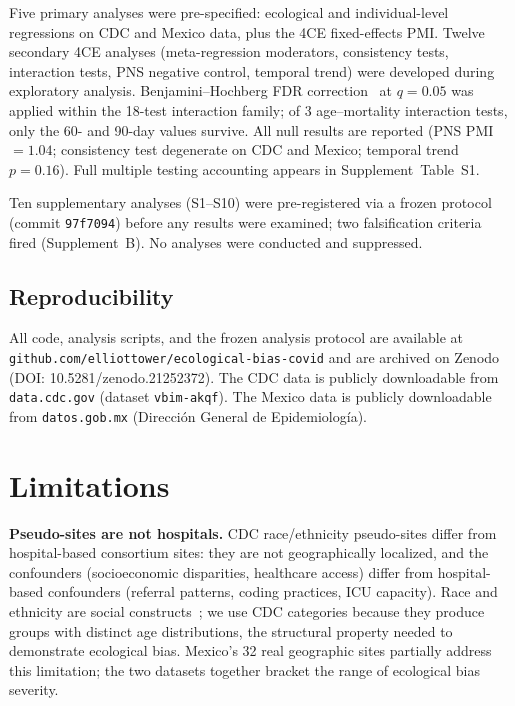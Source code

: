 \documentclass[11pt]{article}
\begin{document}
Five primary analyses were pre-specified: ecological and individual-level
regressions on CDC and Mexico data, plus the 4CE fixed-effects PMI.
Twelve secondary 4CE analyses (meta-regression moderators, consistency
tests, interaction tests, PNS negative control, temporal trend) were
developed during exploratory analysis.
Benjamini--Hochberg FDR correction~\cite{benjamini1995fdr} at $q = 0.05$
was applied within the 18-test interaction family; of 3 age--mortality
interaction tests, only the 60- and 90-day values survive.  All null
results are reported (PNS PMI $= 1.04$; consistency test degenerate on
CDC and Mexico; temporal trend $p = 0.16$).  Full multiple testing
accounting appears in Supplement~Table~S1.

Ten supplementary analyses (S1--S10) were pre-registered via a frozen
protocol (commit \texttt{97f7094}) before any results were examined;
two falsification criteria fired (Supplement~B).  No analyses were
conducted and suppressed.

\subsection{Reproducibility}

All code, analysis scripts, and the frozen analysis protocol are
available at
\texttt{github.com/elliottower/ecological-bias-covid}
and are archived on Zenodo (DOI: 10.5281/zenodo.21252372).
The CDC data is publicly downloadable from \texttt{data.cdc.gov} (dataset
\texttt{vbim-akqf}).  The Mexico data is publicly downloadable from
\texttt{datos.gob.mx} (Direcci\'{o}n General de Epidemiolog\'{i}a).


\section{Limitations}

\textbf{Pseudo-sites are not hospitals.}  CDC race/ethnicity pseudo-sites
differ from hospital-based consortium sites: they are not geographically
localized, and the confounders (socioeconomic disparities, healthcare
access) differ from hospital-based confounders (referral patterns, coding
practices, ICU capacity).  Race and ethnicity are social
constructs~\cite{subramanian2009revisiting}; we use CDC categories because
they produce groups with distinct age distributions, the structural property
needed to demonstrate ecological bias.  Mexico's 32 real geographic sites
partially address this limitation; the two datasets together bracket the
range of ecological bias severity.
\end{document}
